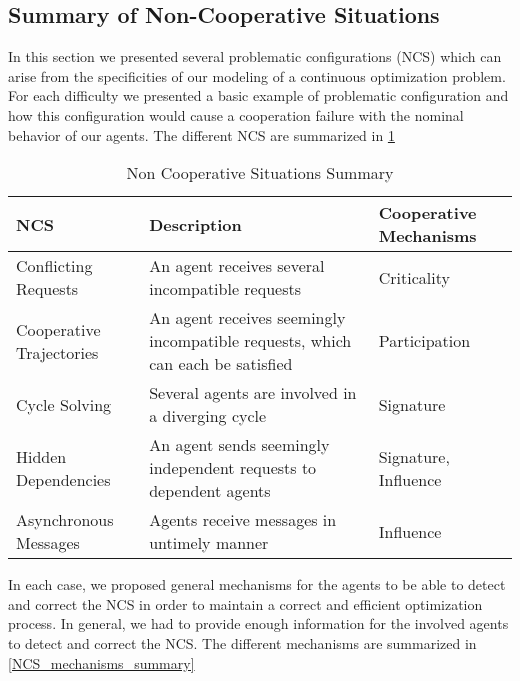\subsection{Summary of Non-Cooperative Situations}

In this section we presented several problematic configurations (NCS) which can arise from the specificities of our modeling of a continuous optimization problem. For each difficulty we presented a basic example of problematic configuration and how this configuration would cause a cooperation failure with the nominal behavior of our agents. The different NCS are summarized in \tablename{} \ref{NCS_summary}

\begin{table}
\caption{Non Cooperative Situations Summary}\label{NCS_summary}
\centering
\begin{tabular}{lp{6.5cm}p{3cm}}
	\toprule
	NCS & Description & Cooperative Mechanisms\\
	\midrule
	Conflicting Requests & An agent receives several incompatible requests & Criticality\\
	Cooperative Trajectories & An agent receives seemingly incompatible requests, which can each be satisfied & Participation\\
	Cycle Solving & Several agents are involved in a diverging cycle & Signature\\
	Hidden Dependencies & An agent sends seemingly independent requests to dependent agents & Signature, Influence\\
	Asynchronous Messages & Agents receive messages in untimely manner & Influence\\
	\bottomrule
\end{tabular}

\end{table}

In each case, we proposed general mechanisms for the agents to be able to detect and correct the NCS in order to maintain a correct and efficient optimization process. In general, we had to provide enough information for the involved agents to detect and correct the NCS. The different mechanisms are summarized in \tablename{} \ref{NCS_mechanisms_summary}

